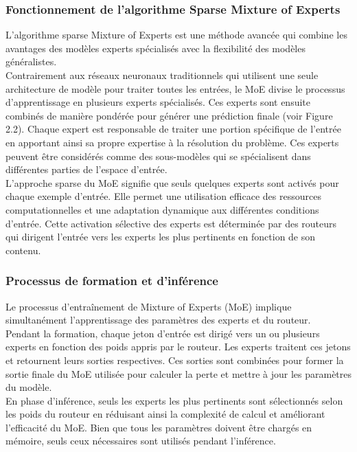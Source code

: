 \subsubsection{Fonctionnement de l'algorithme Sparse Mixture of Experts}
\justifying
L'algorithme sparse Mixture of Experts est une méthode avancée qui combine les avantages des modèles experts spécialisés avec la flexibilité des modèles généralistes.\\
Contrairement aux réseaux neuronaux traditionnels qui utilisent une seule architecture de modèle pour traiter toutes les entrées, le MoE divise le processus d'apprentissage en plusieurs experts spécialisés. Ces experts sont ensuite combinés de manière pondérée pour générer une prédiction finale (voir Figure 2.2). Chaque expert est responsable de traiter une portion spécifique de l'entrée en apportant ainsi sa propre expertise à la résolution du problème. Ces experts peuvent être considérés comme des sous-modèles qui se spécialisent dans différentes parties de l'espace d'entrée.\\
L'approche sparse du MoE signifie que seuls quelques experts sont activés pour chaque exemple d'entrée. Elle permet une utilisation efficace des ressources computationnelles et une adaptation dynamique aux différentes conditions d'entrée. Cette activation sélective des experts est déterminée par des routeurs qui dirigent l'entrée vers les experts les plus pertinents en fonction de son contenu.

\subsubsection{Processus de formation et d'inférence}
\justifying
Le processus d'entraînement de Mixture of Experts (MoE) implique simultanément l'apprentissage des paramètres des experts et du routeur. \\
Pendant la formation, chaque jeton d'entrée est dirigé vers un ou plusieurs experts en fonction des poids appris par le routeur. Les experts traitent ces jetons et retournent leurs sorties respectives. Ces sorties sont combinées pour former la sortie finale du MoE utilisée pour calculer la perte et mettre à jour les paramètres du modèle.\\
En phase d'inférence, seuls les experts les plus pertinents sont sélectionnés selon les poids du routeur en réduisant ainsi la complexité de calcul et améliorant l'efficacité du MoE. Bien que tous les paramètres doivent être chargés en mémoire, seuls ceux nécessaires sont utilisés pendant l'inférence.

